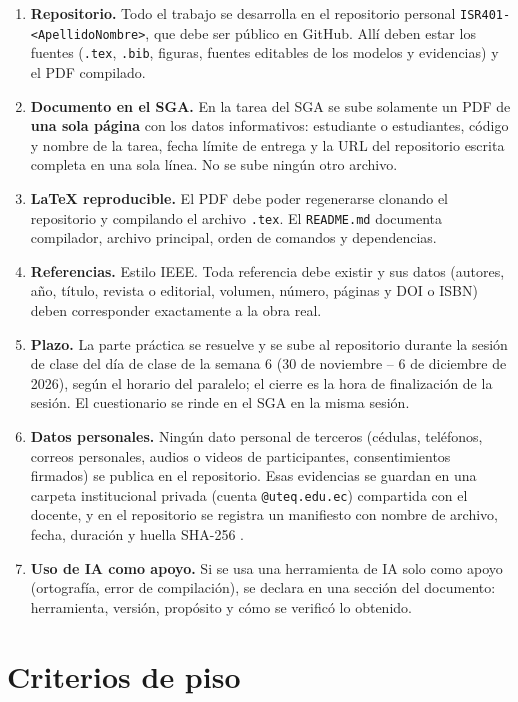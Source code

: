 \documentclass[11pt]{article}
\newcommand{\seccion}[1]{\section{\textcolor{utegreendk}{#1}}}
\begin{document}
\begin{enumerate}[leftmargin=20pt,itemsep=3pt]
	\item \textbf{Repositorio.} Todo el trabajo se desarrolla en el repositorio personal \texttt{ISR401-<ApellidoNombre>}, que debe ser público en GitHub. Allí deben estar los fuentes (\texttt{.tex}, \texttt{.bib}, figuras, fuentes editables de los modelos y evidencias) y el PDF compilado.
	\item \textbf{Documento en el SGA.} En la tarea del SGA se sube solamente un PDF de \textbf{una sola página} con los datos informativos: estudiante o estudiantes, código y nombre de la tarea, fecha límite de entrega y la URL del repositorio escrita completa en una sola línea. No se sube ningún otro archivo.
	\item \textbf{\LaTeX{} reproducible.} El PDF debe poder regenerarse clonando el repositorio y compilando el archivo \texttt{.tex}. El \texttt{README.md} documenta compilador, archivo principal, orden de comandos y dependencias.
	\item \textbf{Referencias.} Estilo IEEE. Toda referencia debe existir y sus datos (autores, año, título, revista o editorial, volumen, número, páginas y DOI o ISBN) deben corresponder exactamente a la obra real.
	\item \textbf{Plazo.} La parte práctica se resuelve y se sube al repositorio durante la sesión de clase del día de clase de la semana 6 (30 de noviembre -- 6 de diciembre de 2026), según el horario del paralelo; el cierre es la hora de finalización de la sesión. El cuestionario se rinde en el SGA en la misma sesión.
	\item \textbf{Datos personales.} Ningún dato personal de terceros (cédulas, teléfonos, correos personales, audios o videos de participantes, consentimientos firmados) se publica en el repositorio. Esas evidencias se guardan en una carpeta institucional privada (cuenta \texttt{@uteq.edu.ec}) compartida con el docente, y en el repositorio se registra un manifiesto con nombre de archivo, fecha, duración y huella SHA-256 \citep{lopdp_2021}.
	\item \textbf{Uso de IA como apoyo.} Si se usa una herramienta de IA solo como apoyo (ortografía, error de compilación), se declara en una sección del documento: herramienta, versión, propósito y cómo se verificó lo obtenido.
\end{enumerate}

\seccion{Criterios de piso}
\end{document}

